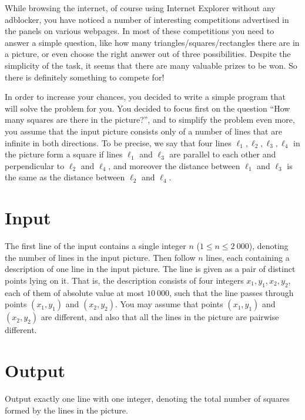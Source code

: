 

While browsing the internet, of course using Internet Explorer without any adblocker, you have noticed a number of interesting competitions advertised in the panels on various webpages. In most of these competitions you need to answer a simple question, like how many triangles/squares/rectangles there are in a picture, or even choose the right answer out of three possibilities. Despite the simplicity of the task, it seems that there are many valuable prizes to be won. So there is definitely something to compete for!

In order to increase your chances, you decided to write a simple program that will solve the problem for you. You decided to focus first on the question ``How many squares are there in the picture?'', and to simplify the problem even more, you assume that the input picture consists only of a number of lines that are infinite in both directions. To be precise, we say that four lines $\ell_1,\ell_2,\ell_3,\ell_4$ in the picture form a square if lines $\ell_1$ and $\ell_3$ are parallel to each other and perpendicular to $\ell_2$ and $\ell_4$, and moreover the distance between $\ell_1$ and $\ell_3$ is the same as the distance between $\ell_2$ and $\ell_4$.

\section*{Input}

The first line of the input contains a single integer $n$ ($1\leq n\leq 2\ 000$), denoting the number of lines in the input picture. Then follow $n$ lines, each containing a description of one line in the input picture. The line is given as a pair of distinct points lying on it. That is, the description consists of four integers $x_1,y_1,x_2,y_2$, each of them of absolute value at most $10\ 000$, such that the line passes through points $(x_1,y_1)$ and $(x_2,y_2)$. You may assume that points $(x_1,y_1)$ and $(x_2,y_2)$ are different, and also that all the lines in the picture are pairwise different.

\section*{Output}

Output exactly one line with one integer, denoting the total number of squares formed by the lines in the picture. 



